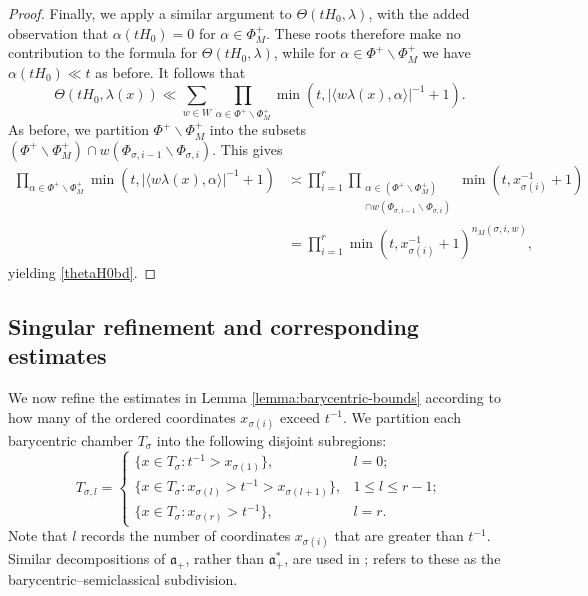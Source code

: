 \documentclass[12pt]{amsart}
\theoremstyle{remark}
\newcommand{\ga}{\mathfrak a}
\begin{document}
\begin{proof}
Finally, we apply a similar argument to $\Theta(tH_0, \lambda)$, with the added observation that $\alpha(tH_0) = 0$ for $\alpha \in \Phi^+_M$.  These roots therefore make no contribution to the formula for $\Theta(tH_0, \lambda)$, while for $\alpha \in \Phi^+ \smallsetminus \Phi^+_M$ we have $\alpha(tH_0) \ll t$ as before.  It follows that
\[
\Theta(tH_0, \lambda(x)) \ll \sum_{w \in W} \prod_{\alpha \in \Phi^+ \smallsetminus \Phi^+_M} \min( t, | \langle w\lambda(x), \alpha \rangle |^{-1} +1).
\]
As before, we partition $\Phi^+ \smallsetminus \Phi^+_M$ into the subsets $(\Phi^+ \smallsetminus \Phi^+_M) \cap w(\Phi_{\sigma, i-1} \smallsetminus \Phi_{\sigma, i})$. This gives
\begin{align*}
\prod_{\alpha \in \Phi^+ \smallsetminus \Phi^+_M} \min( t, | \langle w\lambda(x), \alpha \rangle |^{-1} +1) & \asymp \prod_{i = 1}^r \prod_{ \substack{ \alpha \in (\Phi^+ \smallsetminus \Phi^+_M) \\ \cap w(\Phi_{\sigma, i-1} \smallsetminus \Phi_{\sigma, i}) } } \min( t, x_{\sigma(i)}^{-1} +1) \\
& = \prod_{i = 1}^r \min( t, x_{\sigma(i)}^{-1} +1)^{ n_M(\sigma, i, w) },
\end{align*}
yielding \eqref{thetaH0bd}.
\end{proof}

\subsection{Singular refinement and corresponding estimates}
We now refine the estimates in Lemma \ref{lemma:barycentric-bounds} according to how many of the ordered coordinates $x_{\sigma(i)}$ exceed $t^{-1}$. We partition each barycentric chamber $T_\sigma$ into the following disjoint subregions:
\[
T_{\sigma, l}=\begin{cases}
\{x\in T_\sigma :  t^{-1} > x_{\sigma(1)}\}, & l=0;\\
\{x\in T_\sigma : x_{\sigma(l)} > t^{-1} > x_{\sigma(l+1)}\}, & 1\le l\le r-1;\\
\{x\in T_\sigma : x_{\sigma(r)} > t^{-1} \}, & l=r.
\end{cases}
\]
Note that $l$ records the number of coordinates $x_{\sigma(i)}$ that are greater than $t^{-1}$.  Similar decompositions of $\ga_+$, rather than $\ga_+^*$, are used in \cite{Marshall,Zhang}; \cite{Zhang} refers to these as the barycentric--semiclassical subdivision.
\end{document}
